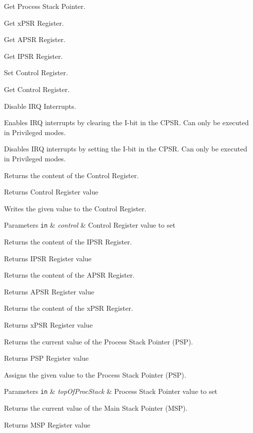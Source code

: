 Get Process Stack Pointer.

Get x\-P\-S\-R Register.

Get A\-P\-S\-R Register.

Get I\-P\-S\-R Register.

Set Control Register.

Get Control Register.

Disable I\-R\-Q Interrupts.

Enables I\-R\-Q interrupts by clearing the I-\/bit in the C\-P\-S\-R. Can only be executed in Privileged modes.

Disables I\-R\-Q interrupts by setting the I-\/bit in the C\-P\-S\-R. Can only be executed in Privileged modes.

Returns the content of the Control Register. \begin{DoxyReturn}{Returns}
Control Register value
\end{DoxyReturn}
Writes the given value to the Control Register. 
\begin{DoxyParams}[1]{Parameters}
\mbox{\tt in}  & {\em control} & Control Register value to set\\
\hline
\end{DoxyParams}
Returns the content of the I\-P\-S\-R Register. \begin{DoxyReturn}{Returns}
I\-P\-S\-R Register value
\end{DoxyReturn}
Returns the content of the A\-P\-S\-R Register. \begin{DoxyReturn}{Returns}
A\-P\-S\-R Register value
\end{DoxyReturn}
Returns the content of the x\-P\-S\-R Register. \begin{DoxyReturn}{Returns}
x\-P\-S\-R Register value
\end{DoxyReturn}
Returns the current value of the Process Stack Pointer (P\-S\-P). \begin{DoxyReturn}{Returns}
P\-S\-P Register value
\end{DoxyReturn}
Assigns the given value to the Process Stack Pointer (P\-S\-P). 
\begin{DoxyParams}[1]{Parameters}
\mbox{\tt in}  & {\em top\-Of\-Proc\-Stack} & Process Stack Pointer value to set\\
\hline
\end{DoxyParams}
Returns the current value of the Main Stack Pointer (M\-S\-P). \begin{DoxyReturn}{Returns}
M\-S\-P Register value
\end{DoxyReturn}

